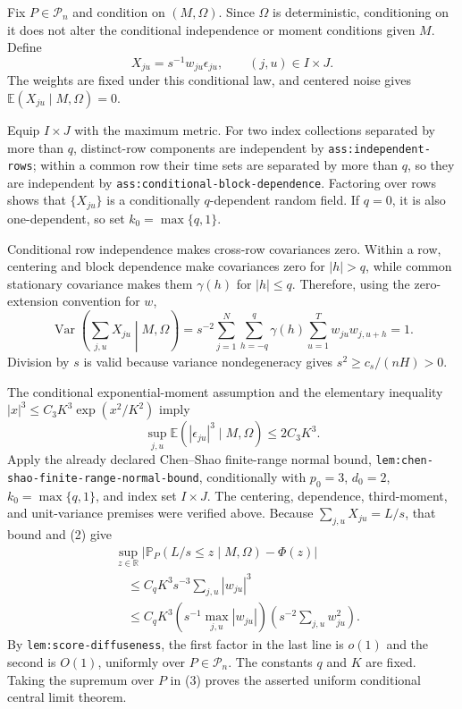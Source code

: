 Fix \(P\in\mathcal P_n\) and condition on \((M,\Omega)\).  Since \(\Omega\) is deterministic, conditioning on it does not alter the conditional independence or moment conditions given \(M\).  Define
\[
 X_{ju}=s^{-1}w_{ju}\epsilon_{ju},
 \qquad (j,u)\in I\times J.
\]
The weights are fixed under this conditional law, and centered noise gives \(\mathbb E(X_{ju}\mid M,\Omega)=0\).

Equip \(I\times J\) with the maximum metric.  For two index collections separated by more than \(q\), distinct-row components are independent by \texttt{ass:independent-rows}; within a common row their time sets are separated by more than \(q\), so they are independent by \texttt{ass:conditional-block-dependence}.  Factoring over rows shows that \(\{X_{ju}\}\) is a conditionally \(q\)-dependent random field.  If \(q=0\), it is also one-dependent, so set \(k_0=\max\{q,1\}\).

Conditional row independence makes cross-row covariances zero.  Within a row, centering and block dependence make covariances zero for \(|h|>q\), while common stationary covariance makes them \(\gamma(h)\) for \(|h|\le q\).  Therefore, using the zero-extension convention for \(w\),
\[
 \operatorname{Var}\!\left(\sum_{j,u}X_{ju}\middle|M,\Omega\right)
 =s^{-2}\sum_{j=1}^N\sum_{h=-q}^q\gamma(h)
    \sum_{u=1}^Tw_{ju}w_{j,u+h}=1.
 \tag{1}
\]
Division by \(s\) is valid because variance nondegeneracy gives \(s^2\ge c_s/(nH)>0\).

The conditional exponential-moment assumption and the elementary inequality \(|x|^3\le C_3K^3\exp(x^2/K^2)\) imply
\[
 \sup_{j,u}\mathbb E(|\epsilon_{ju}|^3\mid M,\Omega)
 \le 2C_3K^3.
 \tag{2}
\]
Apply the already declared Chen--Shao finite-range normal bound, \texttt{lem:chen-shao-finite-range-normal-bound}, conditionally with \(p_0=3\), \(d_0=2\), \(k_0=\max\{q,1\}\), and index set \(I\times J\).  The centering, dependence, third-moment, and unit-variance premises were verified above.  Because \(\sum_{j,u}X_{ju}=L/s\), that bound and (2) give
\[
 \begin{aligned}
 &\sup_{z\in\mathbb R}
 \left|\mathbb P_P(L/s\le z\mid M,\Omega)-\Phi(z)\right|\\
 &\quad\le C_qK^3s^{-3}\sum_{j,u}|w_{ju}|^3\\
 &\quad\le C_qK^3
 \left(s^{-1}\max_{j,u}|w_{ju}|\right)
 \left(s^{-2}\sum_{j,u}w_{ju}^2\right).
 \end{aligned}
 \tag{3}
\]
By \texttt{lem:score-diffuseness}, the first factor in the last line is \(o(1)\) and the second is \(O(1)\), uniformly over \(P\in\mathcal P_n\).  The constants \(q\) and \(K\) are fixed.  Taking the supremum over \(P\) in (3) proves the asserted uniform conditional central limit theorem.

